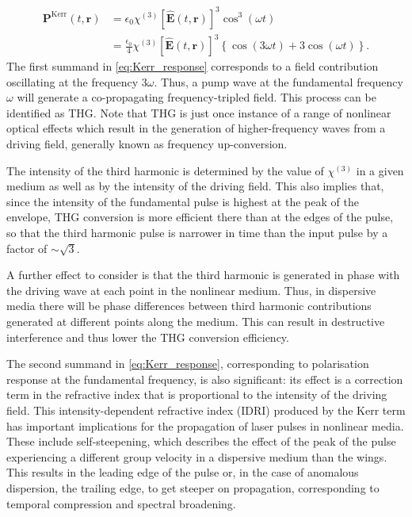 \documentclass[a4paper]{jpconf}
\begin{document}
\begin{align}\label{eq:Kerr_response}
\nonumber  \mathbf{P}^\text{Kerr}(t,\mathbf{r}) &= \epsilon_0 \chi^{(3)} [\hat{\mathbf{E}}(t, \mathbf{r})]^3 \cos^3(\omega t) \\ &= \frac{\epsilon_0}{4}  \chi^{(3)} [\hat{\mathbf{E}}(t, \mathbf{r})]^3 \left\{ \cos (3\omega t) +  3 \cos(\omega t)\right\}.
\end{align}
The first summand in \eqref{eq:Kerr_response} corresponds to a field contribution oscillating at the frequency $3 \omega$. Thus, a pump wave at the fundamental frequency $\omega$ will generate a co-propagating frequency-tripled field. This process can be identified as THG. Note that THG is just once instance of a range of nonlinear optical effects which result in the generation of higher-frequency waves from a driving field, generally known as frequency up-conversion. \par 
The intensity of the third harmonic is determined by the value of $\chi^{(3)}$ in a given medium as well as by the intensity of the driving field. This also implies that, since the intensity of the fundamental pulse is highest at the peak of the envelope, THG conversion is more efficient there than at the edges of the pulse, so that the third harmonic pulse is narrower in time than the input pulse by a factor of $\sim\sqrt{3}$. \par 
 A further effect to consider is that the third harmonic is generated in phase with the driving wave at each point in the nonlinear medium. Thus, in dispersive media there will be phase differences between third harmonic contributions generated at different points along the medium. This can result in destructive interference and thus lower the THG conversion efficiency. \par 
The second summand in \eqref{eq:Kerr_response}, corresponding to polarisation response at the fundamental frequency, is also significant: its effect is a correction term in the refractive index that is proportional to the intensity of the driving field. This intensity-dependent refractive index (IDRI) produced by the Kerr term has important implications for the propagation of laser pulses in nonlinear media. These include self-steepening, which describes the effect of the peak of the pulse experiencing a different group velocity in a dispersive medium than the wings. This results in the leading edge of the pulse or, in the case of anomalous dispersion, the trailing edge, to get steeper on propagation, corresponding to temporal compression and spectral broadening. \par 
\end{document}
